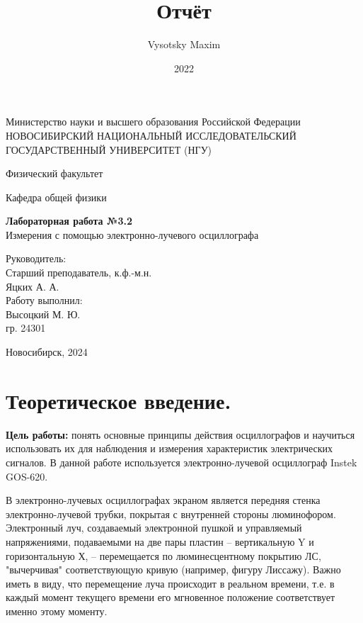 \documentclass[a4paper,12pt]{article}
\author{Vysotsky Maxim}
\title{Отчёт}
\date{2022}
\begin{document}
	\begin{titlepage}
		\begin{center}
			{Министерство науки и высшего образования Российской Федерации
				НОВОСИБИРСКИЙ НАЦИОНАЛЬНЫЙ ИССЛЕДОВАТЕЛЬСКИЙ
				ГОСУДАРСТВЕННЫЙ УНИВЕРСИТЕТ (НГУ)}
		\end{center}
		\begin{center}
			{Физический факультет}
		\end{center}
		\begin{center}
			{Кафедра общей физики}
		\end{center}
		
		
		\vspace{7cm}
		{
			\begin{center}
				{\bf Лабораторная работа №3.2}\\
				Измерения с помощью электронно-лучевого
осциллографа
			\end{center}
		}
		\vspace{2cm}
		\begin{flushright}
			{Руководитель:\\ Старший преподаватель, к.ф.-м.н. \\
				Яцких А. А.\\
				Работу выполнил:\\
				Высоцкий М. Ю.\\
				\vspace{0.2cm}
				гр. 24301}
		\end{flushright}
		\vspace{3cm}
		\begin{center}
			Новосибирск, 2024
		\end{center}
	\end{titlepage}


\section{Теоретическое введение.}
\textbf{Цель работы:} понять основные принципы действия осциллографов и научиться использовать их для наблюдения и измерения характеристик электрических сигналов. В данной работе используется электронно-лучевой осциллограф Instek GOS-620.

В электронно-лучевых осциллографах экраном является передняя
стенка электронно-лучевой трубки, покрытая с внутренней стороны люминофором. Электронный луч, создаваемый электронной пушкой и управляемый напряжениями, подаваемыми на две пары пластин – вертикальную Y и горизонтальную Х, – перемещается по люминесцентному покрытию ЛС, "вычерчивая" соответствующую кривую (например, фигуру Лиссажу). Важно иметь в виду, что перемещение луча происходит в реальном времени, т.е. в каждый момент текущего времени его мгновенное положение соответствует именно этому моменту.
\end{document}
